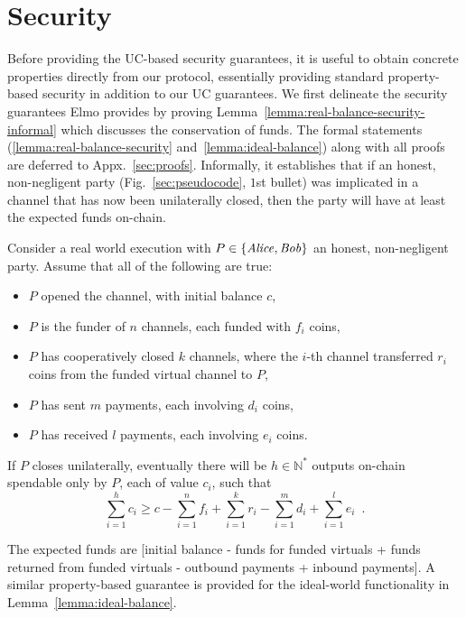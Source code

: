 \section{Security}
  \label{section:security}
    Before providing the UC-based security guarantees, it is useful to obtain
  concrete properties directly from our protocol, essentially providing standard
  property-based security in addition to our UC guarantees. We first delineate the
  security guarantees Elmo provides by proving
  Lemma~\ref{lemma:real-balance-security-informal} which discusses the
  conservation of funds. The formal statements
  (\ref{lemma:real-balance-security} and~\ref{lemma:ideal-balance}) along with
  all proofs are deferred
  to Appx.~\ref{sec:proofs}. Informally, it
  establishes that if an honest, non-negligent party (Fig.~\ref{sec:pseudocode},
  $1$st bullet) was implicated in a channel
  that has now been unilaterally closed,
  then the party will have at least the expected funds on-chain.

\begin{lemma}
\label{lemma:real-balance-security-informal}
  Consider a real world execution with $P \in \{\mathit{Alice}, \mathit{Bob}\}$ an honest,
  non-negligent party. Assume that all of the following are true:
  \begin{itemize}
    \item $P$ opened the channel, with initial balance $c$,
    \item $P$ is the funder of $n$ channels, each funded with $f_i$ coins,
    \item $P$ has cooperatively closed $k$ channels, where the $i$-th channel
    transferred $r_i$ coins from the funded virtual channel to $P$,
    \item $P$ has sent $m$ payments, each involving $d_i$ coins,
    \item $P$ has received $l$ payments, each involving $e_i$ coins.
  \end{itemize}
  If $P$ closes unilaterally, eventually there will be $h \in \mathbb{N}^*$ outputs on-chain
  spendable only by $P$, each of value $c_i$, such that
  \begin{equation}
    \sum\limits_{i=1}^h c_i \geq c - \sum\limits_{i=1}^n f_i +
    \sum\limits_{i=1}^k r_i - \sum\limits_{i=1}^m d_i + \sum\limits_{i=1}^l e_i
    \enspace.
  \end{equation}
\end{lemma}

  The expected funds are [initial balance - funds for funded
  virtuals + funds returned from funded virtuals - outbound payments + inbound
  payments]. A
  similar property-based guarantee is provided for the ideal-world functionality
  \fchan in Lemma~\ref{lemma:ideal-balance}.

